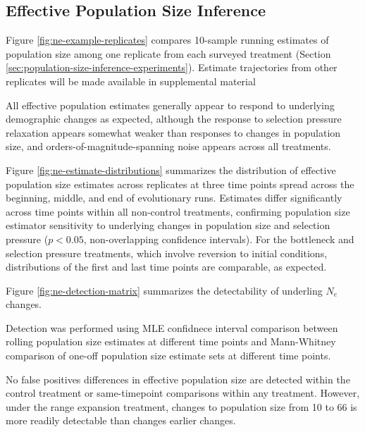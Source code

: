 \subsection{Effective Population Size Inference}



Figure \ref{fig:ne-example-replicates} compares 10-sample running estimates of population size among one replicate from each surveyed treatment (Section \ref{sec:population-size-inference-experiments}).
Estimate trajectories from other replicates will be made available in supplemental material

All effective population estimates generally appear to respond to underlying demographic changes as expected, although the response to selection pressure relaxation appears somewhat weaker than responses to changes in population size, and orders-of-magnitude-spanning noise appears across all treatments.



Figure \ref{fig:ne-estimate-distributions} summarizes the distribution of effective population size estimates across replicates at three time points spread across the beginning, middle, and end of evolutionary runs.
Estimates differ significantly across time points within all non-control treatments, confirming population size estimator sensitivity to underlying changes in population size and selection pressure ($p < 0.05$, non-overlapping confidence intervals).
For the bottleneck and selection pressure treatments, which involve reversion to initial conditions, distributions of the first and last time points are comparable, as expected.



Figure \ref{fig:ne-detection-matrix} summarizes the detectability of underling $N_e$ changes.

Detection was performed using MLE confidnece interval comparison between rolling population size estimates at different time points and Mann-Whitney comparison of one-off population size estimate sets at different time points.

No false positives differences in effective population size are detected within the control treatment or same-timepoint comparisons within any treatment.
However, under the range expansion treatment, changes to population size from 10 to 66 is more readily detectable than changes earlier changes.


